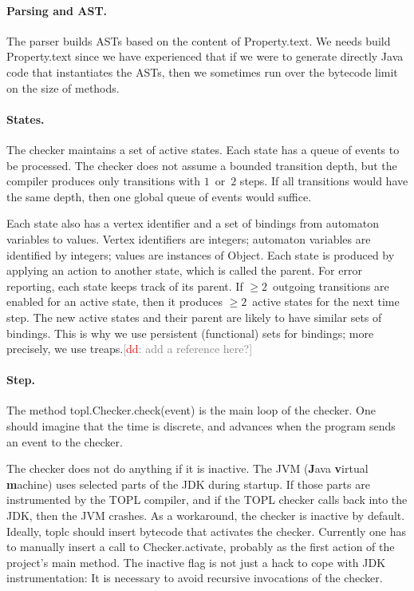 \documentclass{sigplanconf}[10pt] %
\newcommand{\noterg}[2]{\textcolor{gray}{[\textcolor{red}{#1}: #2]}}
\newcommand{\dd}[1]{\noterg{dd}{#1}}
\newcommand{\dinocomment}[1]{\dd{#1}}
\begin{document}
\paragraph{Parsing and AST\null.}
The parser builds ASTs based on the content of \textsf{Property.text}.
We needs build \textsf{Property.text} since we have experienced that if we were to
 generate directly Java code that instantiates the ASTs,
 then we sometimes run over the bytecode limit on the size of methods.

\paragraph{States.}
The checker maintains a set of active states.
Each state has a queue of events to be processed.
The checker does not assume a bounded transition depth, but the compiler produces only transitions with $1$~or~$2$ steps.
If all transitions would have the same depth, then one global queue of events would suffice.

Each state also has a vertex identifier and a set of bindings from automaton variables to values.
Vertex identifiers are integers; automaton variables are identified by integers; values are instances of \textsf{Object}.
Each state is produced by applying an action to another state, which is called the parent.
For error reporting, each state keeps track of its parent.
If $\ge2$~outgoing transitions are enabled for an active state, then it produces $\ge2$~active states for the next time step.
The new active states and their parent are likely to have similar sets of bindings.
This is why we use persistent (functional) sets for bindings; more precisely, we use treaps.\dinocomment{add a reference here?}

\paragraph{Step.}
The method \textsf{topl.Checker.check(event)} is the main loop of the checker.
One should imagine that the time is discrete, and advances when the program sends an event to the checker.

The checker does not do anything if it is inactive.
The JVM (\textbf Java \textbf virtual \textbf machine) uses selected parts of the JDK during startup.
If those parts are instrumented by the TOPL compiler, and if the TOPL checker calls back into the JDK, then the JVM crashes.
As a workaround, the checker is inactive by default.
Ideally, \textsf{toplc} should insert bytecode that activates the checker.
Currently one has to manually insert a call to \textsf{Checker.activate}, probably as the first action of the project's \textsf{main} method.
The inactive flag is not just a hack to cope with JDK instrumentation:
It is necessary to avoid recursive invocations of the checker.
\end{document}
